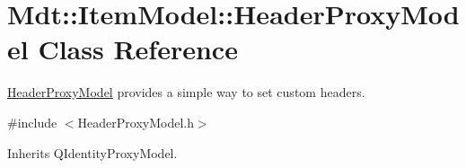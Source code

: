 \hypertarget{class_mdt_1_1_item_model_1_1_header_proxy_model}{}\section{Mdt\+:\+:Item\+Model\+:\+:Header\+Proxy\+Model Class Reference}
\label{class_mdt_1_1_item_model_1_1_header_proxy_model}


\hyperlink{class_mdt_1_1_item_model_1_1_header_proxy_model}{Header\+Proxy\+Model} provides a simple way to set custom headers.  




{\ttfamily \#include $<$Header\+Proxy\+Model.\+h$>$}



Inherits Q\+Identity\+Proxy\+Model.

